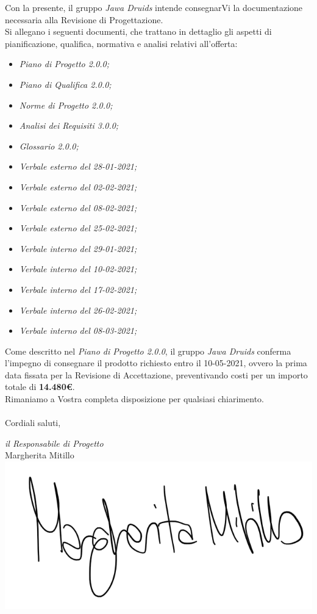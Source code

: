 \documentclass[a4paper,12pt]{report}
\begin{document}
Con la presente, il gruppo \textit{Jawa Druids} intende consegnarVi la documentazione necessaria alla Revisione di Progettazione.
\vspace{1cm}
\\
Si allegano i seguenti documenti, che trattano in dettaglio gli aspetti di pianificazione, qualifica, normativa e analisi relativi all'offerta:
\begin{itemize}
  \item \textit{Piano di Progetto 2.0.0;}
  \item \textit{Piano di Qualifica 2.0.0;}
  \item \textit{Norme di Progetto 2.0.0;}
  \item \textit{Analisi dei Requisiti 3.0.0;}
  \item \textit{Glossario 2.0.0;}
  \item \textit{Verbale esterno del 28-01-2021;}
  \item \textit{Verbale esterno del 02-02-2021;}
  \item \textit{Verbale esterno del 08-02-2021;}
  \item \textit{Verbale esterno del 25-02-2021;}
  \item \textit{Verbale interno del 29-01-2021;}
  \item \textit{Verbale interno del 10-02-2021;}
  \item \textit{Verbale interno del 17-02-2021;}
  \item \textit{Verbale interno del 26-02-2021;}
  \item \textit{Verbale interno del 08-03-2021;}
\end{itemize}
\vspace{0.7cm}

Come descritto nel \textit{Piano di Progetto 2.0.0}, il gruppo \textit{Jawa Druids} conferma l’impegno di consegnare il prodotto richiesto entro il 10-05-2021, ovvero la prima data fissata per la Revisione di Accettazione, preventivando costi per un importo totale di \textbf{14.480\euro}.\\
Rimaniamo a Vostra completa disposizione per qualsiasi chiarimento.\\
\vspace{0.3cm}
\\
Cordiali saluti,
\begin{flushright}
  \textit{il Responsabile di Progetto} \\
  Margherita Mitillo \\
  \includegraphics[width=0.3\linewidth]{immagini/firme/firma_margherita.png}\\[4ex]
\end{flushright}
\end{document}
